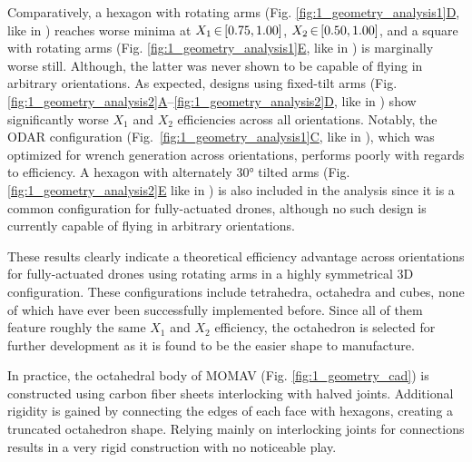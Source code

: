 \documentclass[conference]{IEEEtran}
\newcommand{\mcomp}{\thinmuskip=3mu\medmuskip=3mu\thickmuskip=3mu}
\begin{document}
Comparatively, a hexagon with rotating arms (Fig. \hyperref[fig:1_geometry_analysis1]{\ref*{fig:1_geometry_analysis1}D}, like in \cite{2019_bodie_omav, 2018_kamel_voliro}) reaches worse minima at $\mcomp X_1\in[0.75,1.00]$, $\mcomp X_2\in[0.50,1.00]$, and a square with rotating arms (Fig. \hyperref[fig:1_geometry_analysis1]{\ref*{fig:1_geometry_analysis1}E}, like in \cite{2015_ryll_quadvc}) is marginally worse still. Although, the latter was never shown to be capable of flying in arbitrary orientations. As expected, designs using fixed-tilt arms (Fig. \hyperref[fig:1_geometry_analysis2]{\ref*{fig:1_geometry_analysis2}A}--\hyperref[fig:1_geometry_analysis2]{\ref*{fig:1_geometry_analysis2}D}, like  in \cite{2023_howard_lynchpin, 2016_brescianini_octcu, 2018_park_odar, 2020_hamadi_o7plus}) show significantly worse $X_1$ and $X_2$ efficiencies across all orientations. Notably, the ODAR configuration \mbox{(Fig. \hyperref[fig:1_geometry_analysis1]{\ref*{fig:1_geometry_analysis1}C}}, like in \cite{2018_park_odar}), which was optimized for wrench generation across orientations, performs poorly with regards to efficiency. A hexagon with alternately 30° tilted arms (Fig. \hyperref[fig:1_geometry_analysis2]{\ref*{fig:1_geometry_analysis2}E} like in \cite{2013_jiang_hexc}) is also included in the analysis since it is a common configuration for fully-actuated drones, although no such design is currently capable of flying in arbitrary orientations.
\par
These results clearly indicate a theoretical efficiency advantage across orientations for fully-actuated drones using rotating arms in a highly symmetrical 3D configuration. These configurations include tetrahedra, octahedra and cubes, none of which have ever been successfully implemented before. Since all of them feature roughly the same  $X_1$ and $X_2$ efficiency, the octahedron is selected for further development as it is found to be the easier shape to manufacture.
\par
In practice, the octahedral body of MOMAV (Fig. \ref{fig:1_geometry_cad}) is constructed using carbon fiber sheets interlocking with halved joints. Additional rigidity is gained by connecting the edges of each face with hexagons, creating a truncated octahedron shape. Relying mainly on interlocking joints for connections results in a very rigid construction with no noticeable play.
\par
\end{document}
